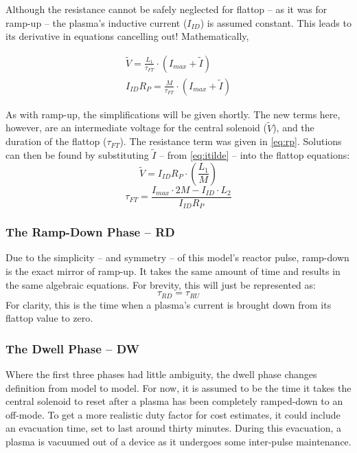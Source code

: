 Although the resistance cannot be safely neglected for flattop -- as it was for ramp-up -- the plasma's inductive current ($I_{ID}$) is assumed constant. This leads to its derivative in equations cancelling out! Mathematically,

\begin{align}
	\tilde V = \frac{L_1}{\tau_{FT}} \cdot \left( I_{max} + \tilde I \right) \\
	I_{ID} R_P = \frac{M}{\tau_{FT}} \cdot \left( I_{max} + \tilde I \right)
\end{align}

As with ramp-up, the simplifications will be given shortly. The new terms here, however, are an intermediate voltage for the central solenoid ($\tilde V$), and the duration of the flattop ($\tau_{FT}$). The resistance term was given in \cref{eq:rp}. Solutions can then be found by substituting $\tilde I$ -- from \cref{eq:itilde} -- into the flattop equations:
\begin{equation}
	\tilde V = I_{ID} R_P \cdot \left( \frac{L_1}{M} \right)	
\end{equation}
\begin{equation}
	\label{eq:tauft}
	\tau_{FT} = \frac{ I_{max} \cdot 2 M - I_{ID} \cdot  L_2 }{I_{ID} R_P}
\end{equation}

\subsubsection{The Ramp-Down Phase -- RD}

Due to the simplicity -- and symmetry -- of this model's reactor pulse, ramp-down is the exact mirror of ramp-up. It takes the same amount of time and results in the same algebraic equations. For brevity, this will just be represented as:
\begin{equation}
	\label{eq:taurd}
	\tau_{RD} = \tau_{RU}
\end{equation}
For clarity, this is the time when a plasma's current is brought down from its flattop value to zero.

\subsubsection{The Dwell Phase -- DW}

Where the first three phases had little ambiguity, the dwell phase changes definition from model to model. For now, it is assumed to be the time it takes the central solenoid to reset after a plasma has been completely ramped-down to an off-mode. To get a more realistic duty factor for cost estimates, it could include an evacuation time, set to last around thirty minutes. During this evacuation, a plasma is vacuumed out of a device as it undergoes some inter-pulse maintenance.

